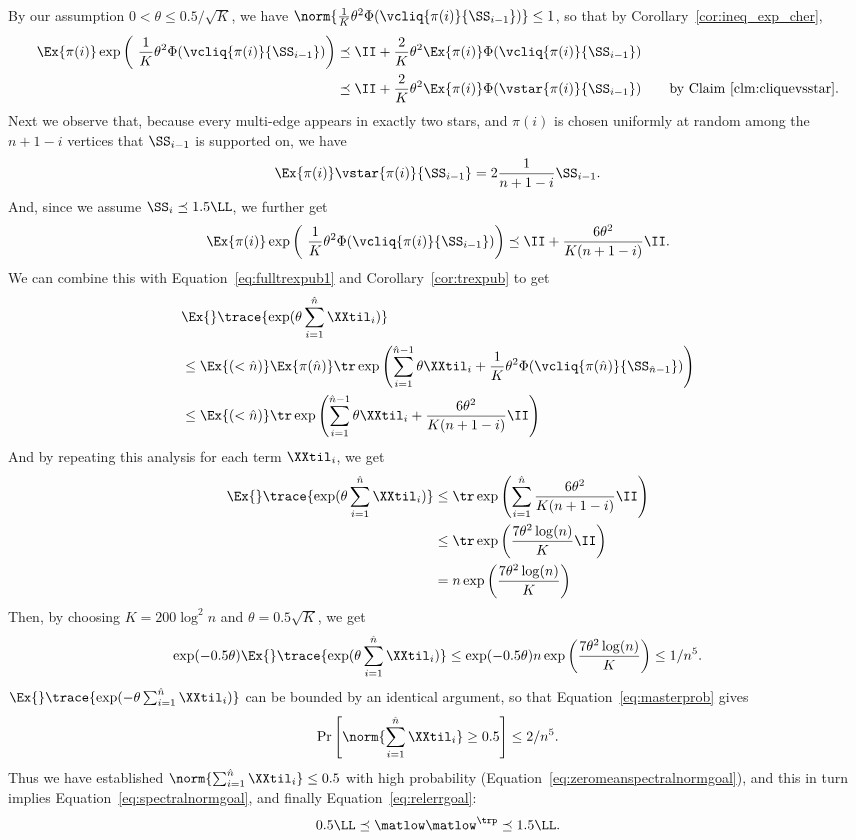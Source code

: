 By our assumption $0 <\theta \leq 0.5/\sqrt{K}$, we have
$\norm{\frac{1}{K}\theta^2\Phi(\vcliq{\pi(i)}{\SS_{i-1}})}
\leq 1$, so that by Corollary~\ref{cor:ineq_exp_cher},
\begin{align}
  \Ex{\pi(i)}
  \exp\left(\
     \frac{1}{K}\theta^2\Phi(\vcliq{\pi(i)}{\SS_{i-1}})
  \right)
  &\preceq
  \II
  +
  \frac{2}{K} \theta^2\Ex{\pi(i)}
    \Phi(\vcliq{\pi(i)}{\SS_{i-1}})
  \\
  &\preceq
  \II
  +
  \frac{2}{K} \theta^2\Ex{\pi(i)}
  \Phi(\vstar{\pi(i)}{\SS_{i-1}})
  \tag*{by Claim~\ref{clm:cliquevsstar}.}
\end{align}
Next we observe that, because every multi-edge appears in exactly two
stars, and $\pi(i)$ is chosen uniformly at random among the $n+1-i$
vertices that $\SS_{i-1}$ is supported on, we have
\[
  \Ex{\pi(i)}
  \vstar{\pi(i)}{\SS_{i-1}}
  =
  2\frac{1}{n+1-i}\SS_{i-1}
  .
\]
And, since we assume $\SS_{i} \preceq 1.5 \LL$, we further get
\[
  \Ex{\pi(i)}
  \exp\left(\
     \frac{1}{K}\theta^2\Phi(\vcliq{\pi(i)}{\SS_{i-1}})
  \right)
  \preceq
  \II
  +
  \frac{6\theta^2}{K(n+1-i)}\II
  .
\]
We can combine this with Equation~\eqref{eq:fulltrexpub1} and
Corollary~\ref{cor:trexpub} to get
\begin{align*}
  &  \Ex{}\trace{\exp(\theta\sum_{i = 1}^{\hat{n}}\XXtil_{i} )}
     \\*  \nonumber
  &  \leq
    \Ex{(<\hat{n})} \Ex{\pi(\hat{n})}
   \tr\exp\left(\sum_{i = 1}^{\hat{n}-1}\theta\XXtil_{i}
     +
     \frac{1}{K}\theta^2\Phi(\vcliq{\pi(\hat{n})}{\SS_{\hat{n}-1}})
    \right)
\\  \nonumber
  &  \leq
    \Ex{(<\hat{n})}
   \tr\exp\left(\sum_{i = 1}^{\hat{n}-1}\theta\XXtil_{i}
     +
    \frac{6\theta^2}{K(n+1-i)}\II
  \right)
\end{align*}
And by repeating this analysis for each term $\XXtil_{i}$, we get
\begin{align*}
 \Ex{}\trace{\exp(\theta\sum_{i = 1}^{\hat{n}}\XXtil_{i} )}
&\leq
   \tr\exp\left(\sum_{i = 1}^{\hat{n}}
    \frac{6\theta^2}{K(n+1-i)}\II
    \right)
\\
  &\leq
\tr\exp\left(
    \frac{7\theta^2\log(n)}{K}\II
    \right)
\\
  &=
    n\exp\left(
    \frac{7\theta^2\log(n)}{K}
    \right)
\end{align*}
Then, by choosing $K = 200 \log^2 n$ and $\theta = 0.5 \sqrt{K}$,
we get
\[
\exp(-0.5 \theta ) \Ex{}\trace{\exp(\theta\sum_{i =
    1}^{\hat{n}}\XXtil_{i} )}
\leq
\exp(-0.5 \theta )
 n\exp\left(
    \frac{7\theta^2\log(n)}{K}
  \right)
  \leq
  1/n^5.
\]
$\Ex{}\trace{\exp(-\theta\sum_{i =
    1}^{\hat{n}}\XXtil_{i} )}$ can be bounded by an identical
argument, so that Equation~\eqref{eq:masterprob} gives
\[
  \Pr\left[ \norm{
\sum_{i =
    1}^{\hat{n}}\XXtil_{i}
  } \geq 0.5 \right] \leq 2/n^5.
  \]
Thus we have established $\norm{
\sum_{i =
    1}^{\hat{n}}\XXtil_{i}
  } \leq 0.5 $ with high probability
  (Equation~\eqref{eq:zeromeanspectralnormgoal}), and this in turn
  implies Equation~\eqref{eq:spectralnormgoal}, and finally
  Equation~\eqref{eq:relerrgoal}:
  \[
0.5 \LL
\preceq
\matlow \matlow^{\trp}
\preceq 1.5 \LL
.
\]

